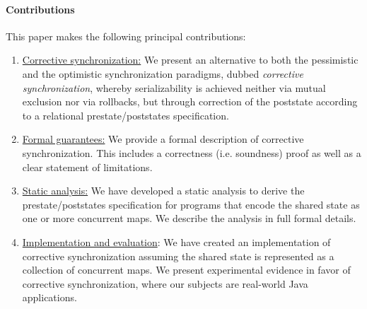 
\paragraph{Contributions} This paper makes the following principal contributions:
\begin{enumerate}
	\item \underline{Corrective synchronization:} We present an alternative to both the pessimistic and the optimistic synchronization paradigms, dubbed \emph{corrective synchronization}, whereby serializability is achieved neither via mutual exclusion nor via rollbacks, but through correction of the poststate according to a relational prestate/poststates specification.
	\item \underline{Formal guarantees:} We provide a formal description of corrective synchronization. This includes a correctness (i.e. soundness) proof as well as a clear statement of limitations.
	\item \underline{Static analysis:} We have developed a static analysis to derive the prestate/poststates specification for programs that encode the shared state as one or more concurrent maps. We describe the analysis in full formal details.
	\item \underline{Implementation and evaluation}: We have created an implementation of corrective synchronization assuming the shared state is represented as a collection of concurrent maps. We present experimental evidence in favor of corrective synchronization, where our subjects are real-world Java applications.
\end{enumerate}